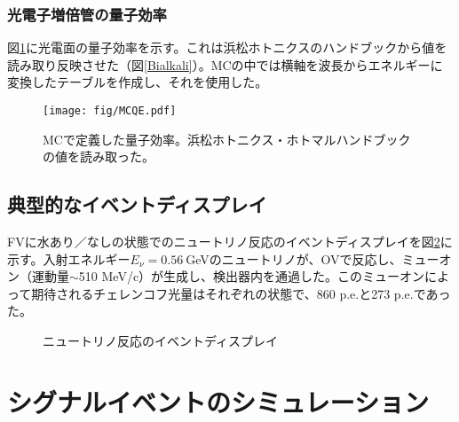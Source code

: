 \documentclass[11pt]{ltjsreport}
\newcommand{\figref}[1]{図\ref{#1}}
\begin{document}
\subsubsection{光電子増倍管の量子効率}
\figref{MCQE}に光電面の量子効率を示す。これは浜松ホトニクスのハンドブックから値を読み取り反映させた（\figref{Bialkali}）。MCの中では横軸を波長からエネルギーに変換したテーブルを作成し、それを使用した。

\begin{figure}[htbp]
\centering
\texttt{[image: fig/MCQE.pdf]}
\caption[MCで定義した量子効率]{MCで定義した量子効率。浜松ホトニクス・ホトマルハンドブックの値を読み取った。}
\label{MCQE}
\end{figure}



\subsection{典型的なイベントディスプレイ}

FVに水あり／なしの状態でのニュートリノ反応のイベントディスプレイを\figref{MCEvtDsp}に示す。入射エネルギー$E_{\nu}=0.56\ $GeVのニュートリノが、OVで反応し、ミューオン（運動量$\sim$510 MeV/c）が生成し、検出器内を通過した。このミューオンによって期待されるチェレンコフ光量はそれぞれの状態で、860 p.e.と273 p.e.であった。

\begin{figure}[htbp]
  \begin{minipage}{0.47\textwidth}
  \end{minipage}
  \hfill
  \begin{minipage}{0.47\textwidth}
  \end{minipage}
    \caption{ニュートリノ反応のイベントディスプレイ}
  \label{MCEvtDsp}
\end{figure}


\section{シグナルイベントのシミュレーション}
\end{document}
